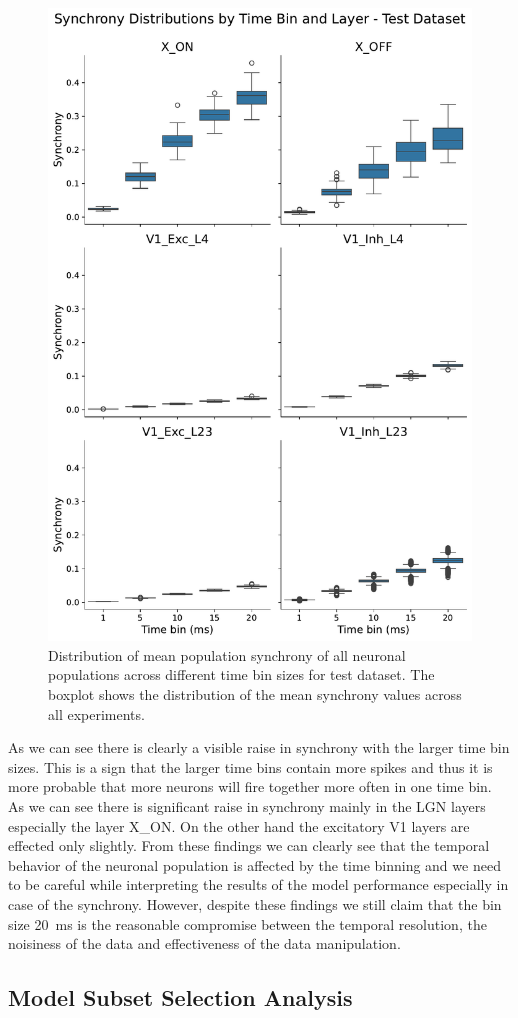 \begin{figure}
    \centering
    \includegraphics[width=0.92\linewidth]{img/plots/synchrony_boxplot_time_bins_test.pdf}
    \caption{Distribution of mean population synchrony of all neuronal populations across different time bin sizes for test dataset. The boxplot shows the distribution of the mean synchrony values across all experiments.}
    \label{fig:boxplot_synchrony_time_test}
\end{figure}

As we can see there is clearly a visible raise in synchrony with the larger time bin sizes. This is a sign that the larger time bins contain more spikes and thus it is more probable that more neurons will fire together more often in one time bin. As we can see there is significant raise in synchrony mainly in the LGN layers especially the layer X\_ON. On the other hand the excitatory V1 layers are effected only slightly. From these findings we can clearly see that the temporal behavior of the neuronal population is affected by the time binning and we need to be careful while interpreting the results of the model performance especially in case of the synchrony. However, despite these findings we still claim that the bin size 20~ms is the reasonable compromise between the temporal resolution, the noisiness of the data and effectiveness of the data manipulation.

\subsection{Model Subset Selection Analysis}
\label{subsec:subset_selection_analysis}
